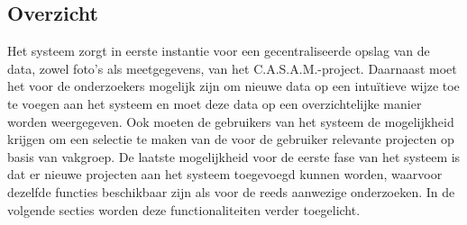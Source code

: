 \subsection{Overzicht}
\label{overzicht}

Het systeem zorgt in eerste instantie voor een gecentraliseerde opslag van de data, zowel foto's als meetgegevens, van het C.A.S.A.M.-project.
Daarnaast moet het voor de onderzoekers mogelijk zijn om nieuwe data op een intu\"itieve wijze toe te voegen aan het systeem en moet deze data op een overzichtelijke manier worden weergegeven. 
Ook moeten de gebruikers van het systeem de mogelijkheid krijgen om een selectie te maken van de voor de gebruiker relevante projecten op basis van vakgroep. 
De laatste mogelijkheid voor de eerste fase van het systeem is dat er nieuwe projecten aan het systeem toegevoegd kunnen worden, waarvoor dezelfde functies beschikbaar zijn als voor de reeds aanwezige onderzoeken. In de volgende secties worden deze functionaliteiten verder toegelicht.
